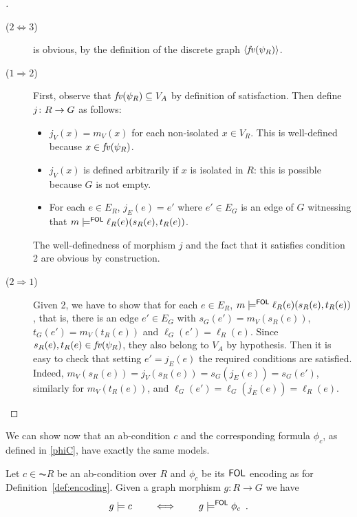 \begin{proof}[]
\begin{description}
\item [($2 \Leftrightarrow 3$)] is obvious, by the definition of the discrete graph $\langle \mathit{fv}(\psi_R) \rangle$.
\item [($1 \Rightarrow  2$)] 

First, observe that $\mathit{fv}(\psi_R) \subseteq V_A$ by  definition of satisfaction. Then define $j\colon R \rightarrow G$ as follows:
\begin{itemize}
\item $j_V(x) = m_V(x)$ for each non-isolated $x \in V_R$. This is well-defined because $x \in \mathit{fv}(\psi_R)$.
\item  $j_V(x)$ is defined arbitrarily if $x$ is isolated in $R$: this is possible because $G$ is not empty.
\item For each $e \in E_R$, $j_E(e) = e'$ where $e' \in E_G$ is an edge of $G$ witnessing that $m \models^{\mathsf{FOL}} \ell_R(e)(s_R(e),t_R(e))$.
\end{itemize}
The well-definedness of morphism $j$ and the fact that it satisfies condition 2 are obvious by construction. 
\item [($2 \Rightarrow  1$)] Given 2, we have to show that for each $e \in E_R$, $m \models^{\mathsf{FOL}} \ell_R(e)(s_R(e),t_R(e))$, that is, there is an edge $e' \in E_G$ with $s_G(e') = m_V(s_R(e))$, $t_G(e') = m_V(t_R(e))$ and $\ell_G(e') = \ell_R(e)$. Since $s_R(e),t_R(e) \in \mathit{fv}(\psi_R)$, they also belong to $V_A$ by hypothesis. Then it is easy to check that setting $e' = j_E(e)$ the required conditions are satisfied. Indeed, $m_V(s_R(e)) = j_V(s_R(e)) = s_G(j_E(e)) = s_G(e')$, similarly for $m_V(t_R(e))$, and $\ell_G(e') = \ell_G(j_E(e)) = \ell_R(e)$.
\end{description}
\end{proof}

We can show now that an ab-condition $c$ and the corresponding formula $\phi_c$, as defined in \eqref{phiC}, have exactly the same models.

\begin{proposition}
  \label{pr:same-models}
  Let $c\in \AC R$ be an ab-condition over $R$ and $\phi_c$ be its $\mathsf{FOL}$ encoding as for Definition~\ref{def:encoding}. Given a graph morphism $g: R \to G$ we have
  \[ g \models c \qquad \iff \qquad g \models^{\mathsf{FOL}} \phi_c\enspace.\] 
\end{proposition}

